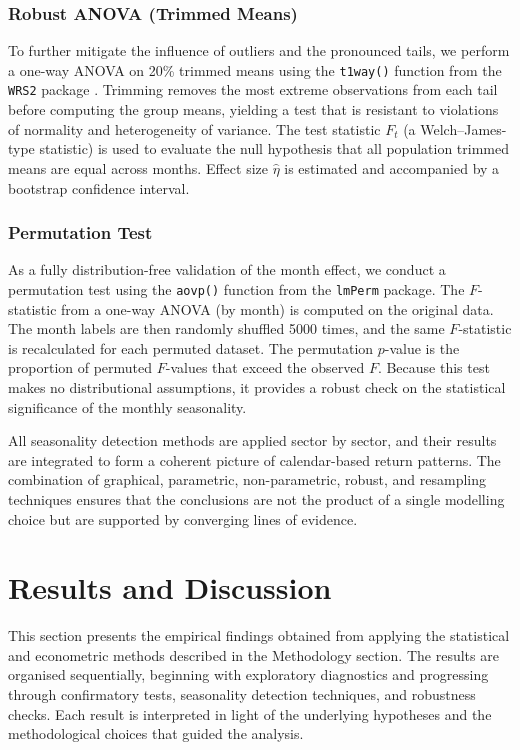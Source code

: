 \documentclass[12pt,a4paper,fleqn]{article}
\begin{document}
\subsubsection{Robust ANOVA (Trimmed Means)}

To further mitigate the influence of outliers and the pronounced tails, we perform a one-way ANOVA on 20\% trimmed means using the \texttt{t1way()} function from the \texttt{WRS2} package \cite{wilcox2017introduction}. Trimming removes the most extreme observations from each tail before computing the group means, yielding a test that is resistant to violations of normality and heterogeneity of variance. The test statistic \(F_t\) (a Welch–James-type statistic) is used to evaluate the null hypothesis that all population trimmed means are equal across months. Effect size \(\hat{\eta}\) is estimated and accompanied by a bootstrap confidence interval.

\subsubsection{Permutation Test}

As a fully distribution-free validation of the month effect, we conduct a permutation test \cite{good2005permutation} using the \texttt{aovp()} function from the \texttt{lmPerm} package. The \(F\)-statistic from a one-way ANOVA (by month) is computed on the original data. The month labels are then randomly shuffled 5000 times, and the same \(F\)-statistic is recalculated for each permuted dataset. The permutation \(p\)-value is the proportion of permuted \(F\)-values that exceed the observed \(F\). Because this test makes no distributional assumptions, it provides a robust check on the statistical significance of the monthly seasonality.

All seasonality detection methods are applied sector by sector, and their results are integrated to form a coherent picture of calendar-based return patterns. The combination of graphical, parametric, non-parametric, robust, and resampling techniques ensures that the conclusions are not the product of a single modelling choice but are supported by converging lines of evidence.

\vspace{15cm}
\section{Results and Discussion}

This section presents the empirical findings obtained from applying the statistical and econometric methods described in the Methodology section. The results are organised sequentially, beginning with exploratory diagnostics and progressing through confirmatory tests, seasonality detection techniques, and robustness checks. Each result is interpreted in light of the underlying hypotheses and the methodological choices that guided the analysis.
\end{document}
